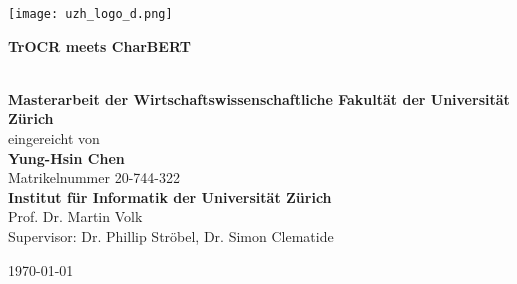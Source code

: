 \begin{titlepage}
\texttt{[image: uzh\_logo\_d.png]}\\ 

\begin{center}

\vspace{1.5cm}
\begin{Huge}\textbf{TrOCR meets CharBERT}\end{Huge}\\

\vspace{2cm}
\vfill {\Large \textbf{Masterarbeit der Wirtschaftswissenschaftliche Fakultät der Universität Zürich}} \\%
\Large eingereicht von\\	\Large\textbf{Yung-Hsin Chen} \\ 
Matrikelnummer 20-744-322 \\

\vspace{4cm}  
\vfill {\Large \textbf{Institut für Informatik der Universität Zürich}\\Prof. Dr. Martin Volk\\
Supervisor: Dr. Phillip Ströbel, Dr. Simon Clematide}

\vspace{1cm}

\vfill{\large \today}
\vspace{3cm}
\end{center}

\end{titlepage}

\newpage
